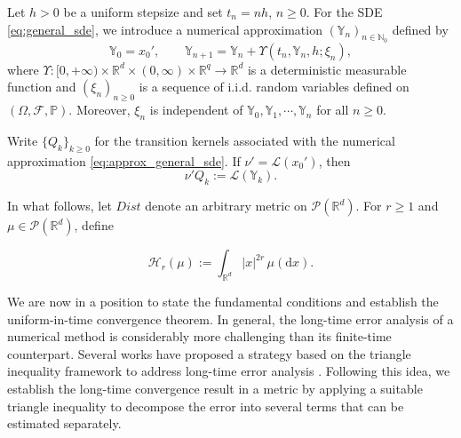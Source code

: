 \documentclass[12pt]{article}
\newenvironment{redtext}
  {\color{black}\ignorespaces}
  {\ignorespacesafterend}
\numberwithin{equation}{section}
\newcommand{\R}{\mathbb{R}}
\begin{document}
Let \(h>0\) be a uniform stepsize and set
\(t_n=nh\), \(n\geq0\). For the SDE \eqref{eq:general_sde},
we introduce a numerical approximation
$(\mathbb Y_n)_{n\in\mathbb N_0}$ defined by
\begin{equation}\label{eq:approx_general_sde}
    \mathbb Y_0=x_0',
    \qquad
    \mathbb Y_{n+1}
    =\mathbb Y_n+\Upsilon(t_n, \mathbb Y_n,h;\xi_n),
\end{equation}
where $\Upsilon\colon[0, +\infty) \times \R^d\times(0,\infty)
\times\R^q\to\R^d$ is a deterministic measurable function
and
$(\xi_n)_{n\geq0}$ is a sequence of i.i.d. random variables
defined on $(\Omega,\mathcal F,\mathbb P)$. 
Moreover, $\xi_n$ is independent of $\mathbb Y_0, \mathbb Y_1, \cdots, \mathbb Y_n$ for all $n\ge 0$.

Write \(\{Q_k\}_{k\ge0}\) for the transition kernels associated with the numerical approximation \eqref{eq:approx_general_sde}. If \(\nu'=\mathcal{L}(x_0')\), then
\[
    \nu'Q_k := \mathcal{L}(\mathbb{Y}_k).
\]

In what follows, let \(\textit{Dist}\) denote
an arbitrary metric on \(\mathcal{P}(\mathbb{R}^d)\). For \(r\ge1\) and
\(\mu\in\mathcal{P}(\mathbb{R}^d)\), define

\[
    \mathcal{H}_r(\mu)
    :=
    \int_{\mathbb{R}^d}|x|^{2r}\,\mu(\mathrm{d}x).
\]


We are now in a position to state the fundamental conditions and establish the uniform-in-time convergence theorem.
%
In general, the long-time error analysis of a numerical method is considerably more challenging than its finite-time counterpart.
%
Several works have proposed a strategy based on the triangle inequality framework to address long-time error analysis \cite{mattingly2010convergence, mckean1967propagation, ye2024error, yang2025non}. 
Following this idea, we establish the long-time convergence result in a metric by applying a suitable triangle inequality to decompose the error into several terms that can be estimated separately.
\end{document}
